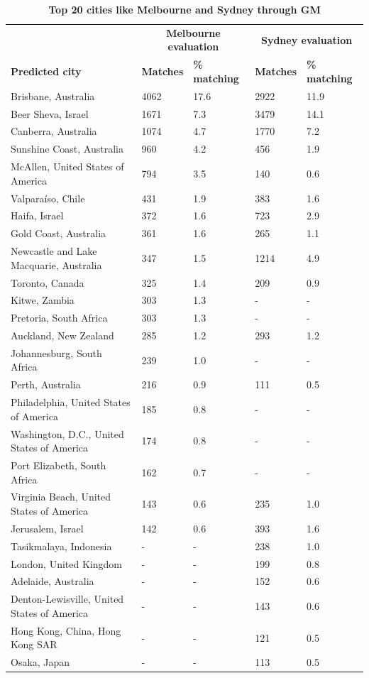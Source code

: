 \documentclass[10pt,letterpaper]{article}
\begin{document}
\begin{table}[!htbp]
\begin{adjustwidth}{-2.25in}{0in}
\caption{\bf Top 20 cities like Melbourne and Sydney through GM \label{tab:melbournesydneyGM}}     
\begin{tabular}{ l l l l l}
 \hline    &  \multicolumn{2}{c}{\textbf{Melbourne evaluation}} & \multicolumn{2}{c}{\textbf{Sydney evaluation}}  \\  
\textbf{Predicted city} & \textbf{Matches} & \textbf{\% matching}  & \textbf{Matches} & \textbf{\% matching}\\ \hline

Brisbane, Australia & 4062 & 17.6 & 2922 & 11.9      \\ 
Beer Sheva, Israel & 1671 & 7.3 & 3479 & 14.1      \\ 
Canberra, Australia & 1074 & 4.7 & 1770 & 7.2      \\
Sunshine Coast, Australia & 960 & 4.2 & 456 & 1.9      \\
McAllen, United States of America & 794 & 3.5 & 140 & 0.6      \\
Valpara\'{i}so, Chile & 431 & 1.9 & 383 & 1.6      \\
Haifa, Israel & 372 & 1.6 & 723 & 2.9      \\
Gold Coast, Australia & 361 & 1.6 & 265 & 1.1      \\
Newcastle and Lake Macquarie, Australia & 347 & 1.5 & 1214 & 4.9      \\
Toronto, Canada & 325 & 1.4 & 209 & 0.9      \\
Kitwe, Zambia & 303 & 1.3 & - & -      \\
Pretoria, South Africa & 303 & 1.3 & - & -      \\
Auckland, New Zealand & 285 & 1.2 & 293 & 1.2      \\
Johannesburg, South Africa & 239 & 1.0 & - & -      \\
Perth, Australia & 216 & 0.9 & 111 & 0.5      \\
Philadelphia, United States of America & 185 & 0.8 & - & -      \\
Washington, D.C., United States of America & 174 & 0.8 & - & -      \\
Port Elizabeth, South Africa & 162 & 0.7 & - & -      \\
Virginia Beach, United States of America & 143 & 0.6 & 235 & 1.0      \\
Jerusalem, Israel & 142 & 0.6 & 393 & 1.6      \\
Tasikmalaya, Indonesia & - & - & 238 & 1.0      \\		
London, United Kingdom & - & - & 199 & 0.8      \\
Adelaide, Australia & - & - & 152 & 0.6      \\
Denton-Lewisville, United States of America & - & - & 143 & 0.6      \\						
Hong Kong, China, Hong Kong SAR & - & - & 121 & 0.5      \\		
Osaka, Japan & - & - & 113 & 0.5      \\


\end{tabular}
\end{adjustwidth}
\end{table}
\end{document}

